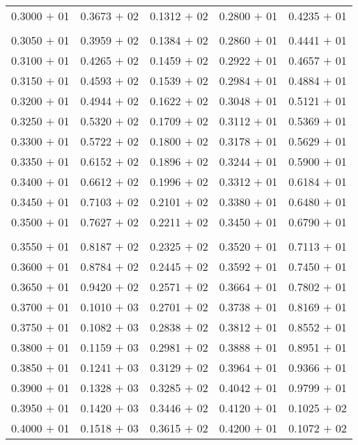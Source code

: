 \documentclass[a4paper,11pt]{article}
\begin{document}
\begin{center}
\begin{longtable}{ c c c c c }
0.3000 $+$ 01 & 0.3673 $+$ 02 & 0.1312 $+$ 02 & 0.2800 $+$ 01 & 0.4235 $+$ 01 \\
\\
0.3050 $+$ 01 & 0.3959 $+$ 02 & 0.1384 $+$ 02 & 0.2860 $+$ 01 & 0.4441 $+$ 01 \\
0.3100 $+$ 01 & 0.4265 $+$ 02 & 0.1459 $+$ 02 & 0.2922 $+$ 01 & 0.4657 $+$ 01 \\
0.3150 $+$ 01 & 0.4593 $+$ 02 & 0.1539 $+$ 02 & 0.2984 $+$ 01 & 0.4884 $+$ 01 \\
0.3200 $+$ 01 & 0.4944 $+$ 02 & 0.1622 $+$ 02 & 0.3048 $+$ 01 & 0.5121 $+$ 01 \\
0.3250 $+$ 01 & 0.5320 $+$ 02 & 0.1709 $+$ 02 & 0.3112 $+$ 01 & 0.5369 $+$ 01 \\
0.3300 $+$ 01 & 0.5722 $+$ 02 & 0.1800 $+$ 02 & 0.3178 $+$ 01 & 0.5629 $+$ 01 \\
0.3350 $+$ 01 & 0.6152 $+$ 02 & 0.1896 $+$ 02 & 0.3244 $+$ 01 & 0.5900 $+$ 01 \\
0.3400 $+$ 01 & 0.6612 $+$ 02 & 0.1996 $+$ 02 & 0.3312 $+$ 01 & 0.6184 $+$ 01 \\
0.3450 $+$ 01 & 0.7103 $+$ 02 & 0.2101 $+$ 02 & 0.3380 $+$ 01 & 0.6480 $+$ 01 \\
0.3500 $+$ 01 & 0.7627 $+$ 02 & 0.2211 $+$ 02 & 0.3450 $+$ 01 & 0.6790 $+$ 01 \\
\\
0.3550 $+$ 01 & 0.8187 $+$ 02 & 0.2325 $+$ 02 & 0.3520 $+$ 01 & 0.7113 $+$ 01 \\
0.3600 $+$ 01 & 0.8784 $+$ 02 & 0.2445 $+$ 02 & 0.3592 $+$ 01 & 0.7450 $+$ 01 \\
0.3650 $+$ 01 & 0.9420 $+$ 02 & 0.2571 $+$ 02 & 0.3664 $+$ 01 & 0.7802 $+$ 01 \\
0.3700 $+$ 01 & 0.1010 $+$ 03 & 0.2701 $+$ 02 & 0.3738 $+$ 01 & 0.8169 $+$ 01 \\
0.3750 $+$ 01 & 0.1082 $+$ 03 & 0.2838 $+$ 02 & 0.3812 $+$ 01 & 0.8552 $+$ 01 \\
0.3800 $+$ 01 & 0.1159 $+$ 03 & 0.2981 $+$ 02 & 0.3888 $+$ 01 & 0.8951 $+$ 01 \\
0.3850 $+$ 01 & 0.1241 $+$ 03 & 0.3129 $+$ 02 & 0.3964 $+$ 01 & 0.9366 $+$ 01 \\
0.3900 $+$ 01 & 0.1328 $+$ 03 & 0.3285 $+$ 02 & 0.4042 $+$ 01 & 0.9799 $+$ 01 \\
0.3950 $+$ 01 & 0.1420 $+$ 03 & 0.3446 $+$ 02 & 0.4120 $+$ 01 & 0.1025 $+$ 02 \\
0.4000 $+$ 01 & 0.1518 $+$ 03 & 0.3615 $+$ 02 & 0.4200 $+$ 01 & 0.1072 $+$ 02 \\

\end{longtable}
\end{center}
\end{document}
